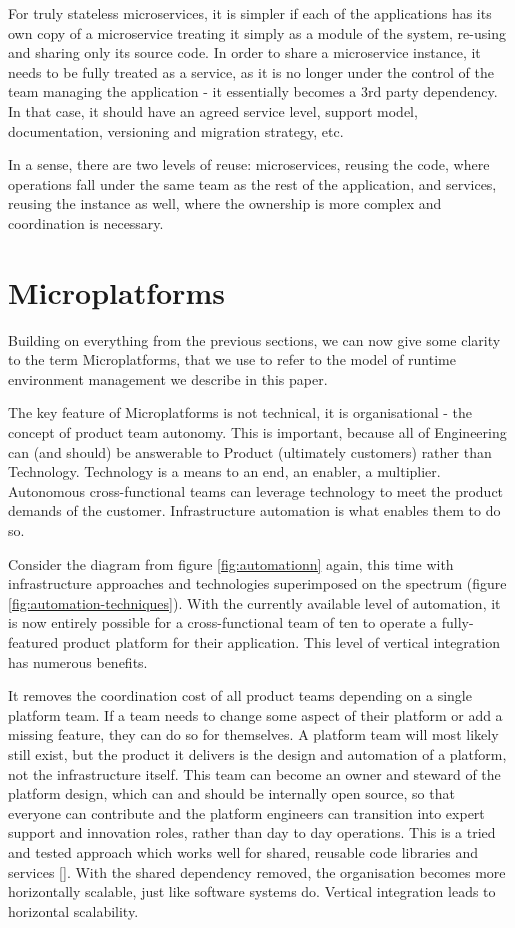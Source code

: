 \documentclass[reprint,amsmath,amssymb,aps]{revtex4-1}
\begin{document}
For truly stateless microservices, it is simpler if each of the applications has its own copy of a microservice treating it simply as a module of the system, re-using and sharing only its source code. In order to share a microservice instance, it needs to be fully treated as a service, as it is no longer under the control of the team managing the application - it essentially becomes a 3rd party dependency. In that case, it should have an agreed service level, support model, documentation, versioning and migration strategy, etc.

In a sense, there are two levels of reuse: microservices, reusing the code, where operations fall under the same team as the rest of the application, and services, reusing the instance as well, where the ownership is more complex and coordination is necessary.

\section{Microplatforms}
\label{sec:microplatforms}

Building on everything from the previous sections, we can now give some clarity to the term Microplatforms, that we use to refer to the model of runtime environment management we describe in this paper.

The key feature of Microplatforms is not technical, it is organisational - the concept of product team autonomy. This is important, because all of Engineering can (and should) be answerable to Product (ultimately customers) rather than Technology. Technology is a means to an end, an enabler, a multiplier. Autonomous cross-functional teams can leverage technology to meet the product demands of the customer. Infrastructure automation is what enables them to do so.

Consider the diagram from figure \ref{fig:automationn} again, this time with infrastructure approaches and technologies superimposed on the spectrum (figure \ref{fig:automation-techniques}). With the currently available level of automation, it is now entirely possible for a cross-functional team of ten to operate a fully-featured product platform for their application. This level of vertical integration has numerous benefits.

It removes the coordination cost of all product teams depending on a single platform team. If a team needs to change some aspect of their platform or add a missing feature, they can do so for themselves. A platform team will most likely still exist, but the product it delivers is the design and automation of a platform, not the infrastructure itself. This team can become an owner and steward of the platform design, which can and should be internally open source, so that everyone can contribute and the platform engineers can transition into expert support and innovation roles, rather than day to day operations. This is a tried and tested approach which works well for shared, reusable code libraries and services []. With the shared dependency removed, the organisation becomes more horizontally scalable, just like software systems do. Vertical integration leads to horizontal scalability.
\end{document}
